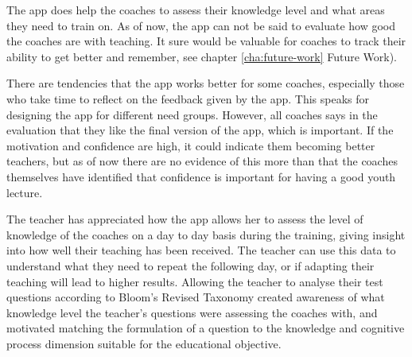   The app does help the coaches to assess their knowledge level and what areas they need to train on. As of now, the app can not be said to evaluate how good the coaches are with teaching. It sure would be valuable for coaches to track their ability to get better and remember, see chapter \ref{cha:future-work} Future Work).

There are tendencies that the app works better for some coaches, especially those who take time to reflect on the feedback given by the app. This speaks for designing the app for different need groups. However, all coaches says in the evaluation that they like the final version of the app, which is important. If the motivation and confidence are high, it could indicate them becoming better teachers, but as of now there are no evidence of this more than that the coaches themselves have identified that confidence is important for having a good youth lecture.

The teacher has appreciated how the app allows her to assess the level of knowledge of the coaches on a day to day basis during the training, giving insight into how well their teaching has been received. The teacher can use this data to understand what they need to repeat the following day, or if adapting their teaching will lead to higher results. Allowing the teacher to analyse their test questions according to Bloom's Revised Taxonomy created awareness of what knowledge level the teacher's questions were assessing the coaches with, and motivated matching the formulation of a question to the knowledge and cognitive process dimension suitable for the educational objective.
